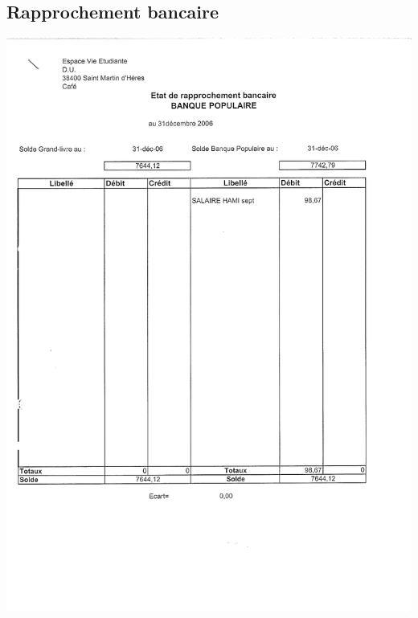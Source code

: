 \subsection{Rapprochement bancaire}
\begin{center}
\includegraphics[scale=0.7]{annexes/images/rapprochement_bancaire.pdf}
\end{center}
